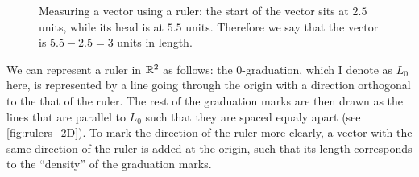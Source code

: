 \begin{figure}
    \begin{center}
    \end{center}
    \caption{Measuring a vector using a ruler: the start of the vector sits at $2.5$ units, while its head is at $5.5$ units. Therefore we say that the vector is $5.5-2.5=3$ units in length.}
    \label{fig:ruler_measure}
\end{figure}

We can represent a ruler in $\Rs[2]$ as follows: the $0$-graduation, which I denote as $L_{0}$ here, is represented by a line going through the origin with a direction orthogonal to the that of the ruler. The rest of the graduation marks are then drawn as the lines that are parallel to $L_{0}$ such that they are spaced equaly apart (see \cref{fig:rulers_2D}). To mark the direction of the ruler more clearly, a vector with the same direction of the ruler is added at the origin, such that its length corresponds to the \enquote{density} of the graduation marks.

